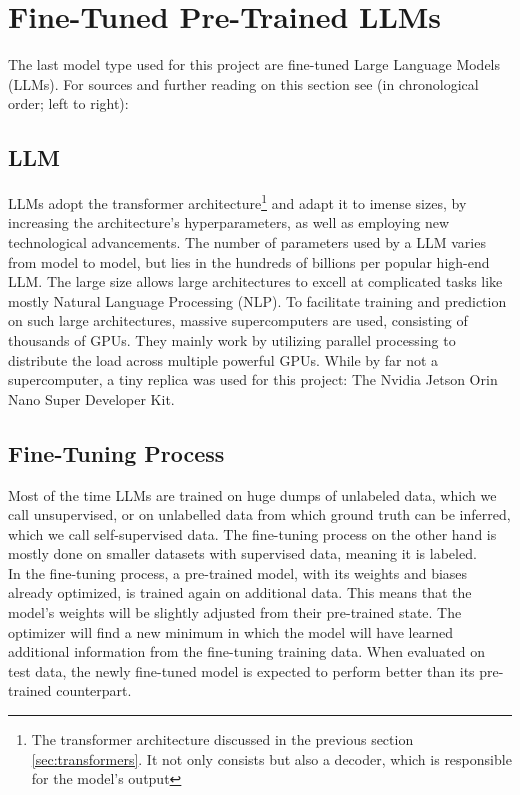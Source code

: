 \documentclass{article}
\begin{document}
\newpage
\section{Fine-Tuned Pre-Trained LLMs}
The last model type used for this project are fine-tuned Large Language Models (LLMs).
For sources and further reading on this section see (in chronological order; left to right): \cite{geeksforgeeks_2024,Stryker_LLM,srinivasan2024transformer,Bergmann_Fine_Tuning}

\subsection{LLM}
LLMs adopt the transformer architecture\footnote{The transformer architecture discussed in the previous section \ref{sec:transformers}. It not only consists but also a decoder, which is responsible for the model's output} and adapt it to imense sizes, by increasing the architecture's hyperparameters, as well as employing new technological advancements. The number of parameters used by a LLM varies from model to model, but lies in the hundreds of billions per popular high-end LLM.
The large size allows large architectures to excell at complicated tasks like mostly Natural Language Processing (NLP).
To facilitate training and prediction on such large architectures, massive supercomputers are used, consisting of thousands of GPUs. They mainly work by utilizing parallel processing to distribute the load across multiple powerful GPUs. While by far not a supercomputer, a tiny replica was used for this project: The Nvidia Jetson Orin Nano Super Developer Kit.

\subsection{Fine-Tuning Process}
Most of the time LLMs are trained on huge dumps of unlabeled data, which we call unsupervised, or on unlabelled data from which ground truth can be inferred, which we call self-supervised data. 
The fine-tuning process on the other hand is mostly done on smaller datasets with supervised data, meaning it is labeled.
\\[2em]
In the fine-tuning process, a pre-trained model, with its weights and biases already optimized, is trained again on additional data. This means that the model's weights will be slightly adjusted from their pre-trained state. The optimizer will find a new minimum in which the model will have learned additional information from the fine-tuning training data. When evaluated on test data, the newly fine-tuned model is expected to perform better than its pre-trained counterpart.
\end{document}
